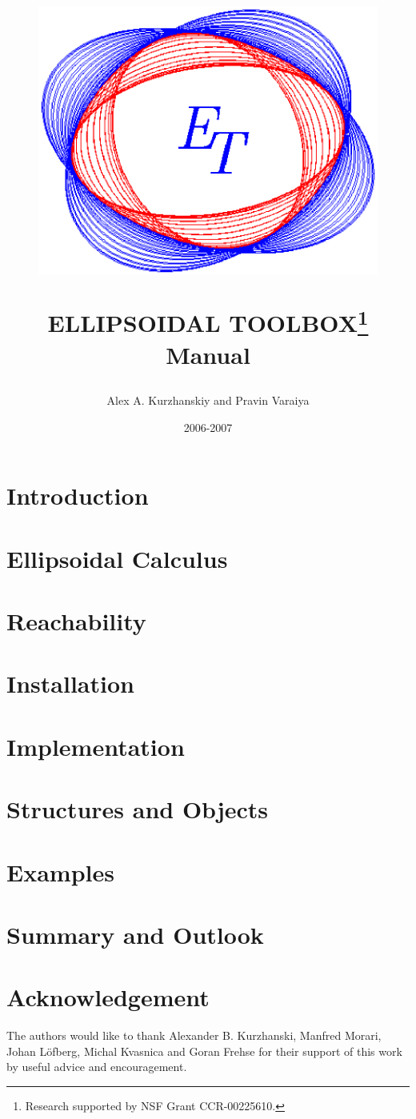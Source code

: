 \documentclass{report}
\title{
\begin{figure}[htbp]
\centerline{
\includegraphics[height=5 cm]{logo.eps}}
\end{figure}
ELLIPSOIDAL TOOLBOX\thanks{Research supported by NSF Grant CCR-00225610.}\\
Manual
\author{Alex A. Kurzhanskiy and Pravin Varaiya}
\date{2006-2007}
}
\begin{document}
\maketitle
\tableofcontents

\chapter{Introduction}\label{ch_intro}


\chapter{Ellipsoidal Calculus}\label{ch_ellcalc}


\chapter{Reachability}\label{ch_reachability}


\chapter{Installation}\label{ch_install}


\chapter{Implementation}\label{ch_implementation}


\chapter{Structures and Objects}\label{ch_objects}


\chapter{Examples}\label{ch_examples}


\chapter{Summary and Outlook}\label{ch_summary}


\chapter*{Acknowledgement}
The authors would like to thank Alexander B. Kurzhanski,
Manfred Morari, Johan L{\"o}fberg, Michal Kvasnica and Goran Frehse
for their support of this work by useful advice and encouragement.
\end{document}

